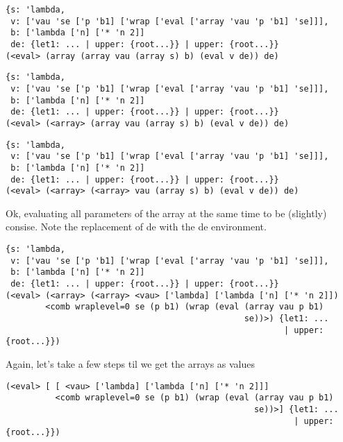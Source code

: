 \documentclass{beamer}
\begin{document}
\begin{frame}[fragile]
\footnotesize
\begin{verbatim}
{s: 'lambda,
 v: ['vau 'se ['p 'b1] ['wrap ['eval ['array 'vau 'p 'b1] 'se]]],
 b: ['lambda ['n] ['* 'n 2]]
 de: {let1: ... | upper: {root...}} | upper: {root...}}
(<eval> (array (array vau (array s) b) (eval v de)) de)
\end{verbatim}
\end{frame}

\begin{frame}[fragile]
\footnotesize
\begin{verbatim}
{s: 'lambda,
 v: ['vau 'se ['p 'b1] ['wrap ['eval ['array 'vau 'p 'b1] 'se]]],
 b: ['lambda ['n] ['* 'n 2]]
 de: {let1: ... | upper: {root...}} | upper: {root...}}
(<eval> (<array> (array vau (array s) b) (eval v de)) de)
\end{verbatim}
\end{frame}

\begin{frame}[fragile]
\footnotesize
\begin{verbatim}
{s: 'lambda,
 v: ['vau 'se ['p 'b1] ['wrap ['eval ['array 'vau 'p 'b1] 'se]]],
 b: ['lambda ['n] ['* 'n 2]]
 de: {let1: ... | upper: {root...}} | upper: {root...}}
(<eval> (<array> (<array> vau (array s) b) (eval v de)) de)
\end{verbatim}
\end{frame}

\begin{frame}[fragile]
Ok, evaluating all parameters of the array at the same time to be (slightly) consise.
Note the replacement of de with the de environment.
\footnotesize
\begin{verbatim}
{s: 'lambda,
 v: ['vau 'se ['p 'b1] ['wrap ['eval ['array 'vau 'p 'b1] 'se]]],
 b: ['lambda ['n] ['* 'n 2]]
 de: {let1: ... | upper: {root...}} | upper: {root...}}
(<eval> (<array> (<array> <vau> ['lambda] ['lambda ['n] ['* 'n 2]])
        <comb wraplevel=0 se (p b1) (wrap (eval (array vau p b1)
		                                        se))>) {let1: ...
												        | upper: {root...}})
\end{verbatim}
\end{frame}

\begin{frame}[fragile]
Again, let's take a few steps til we get the arrays as values
\footnotesize
\begin{verbatim}
(<eval> [ [ <vau> ['lambda] ['lambda ['n] ['* 'n 2]]]
          <comb wraplevel=0 se (p b1) (wrap (eval (array vau p b1)
		                                          se))>] {let1: ...
												          | upper: {root...}})
\end{verbatim}
\end{frame}
\end{document}
